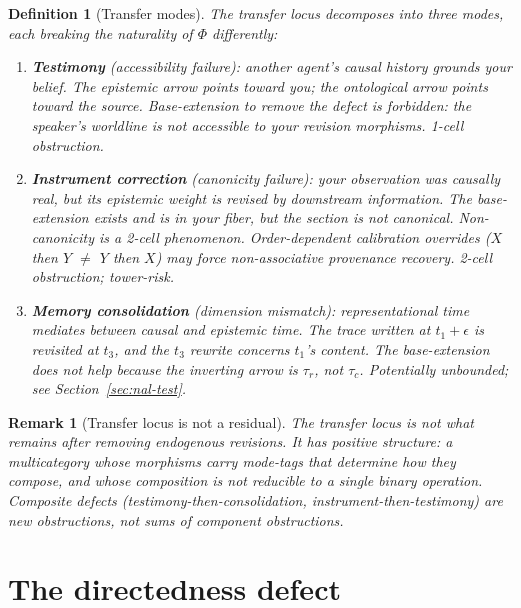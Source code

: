 \documentclass[11pt]{article}
\newtheorem{definition}{Definition}
\newtheorem{remark}{Remark}
\newcommand{\tauc}{\tau_c}
\newcommand{\taur}{\tau_r}
\begin{document}
\begin{definition}[Transfer modes]
\label{def:transfer-modes}
The transfer locus decomposes into three modes, each breaking the naturality of $\Phi$
differently:
\begin{enumerate}
  \item \textbf{Testimony} (accessibility failure): another agent's causal history grounds your
        belief. The epistemic arrow points toward you; the ontological arrow points toward the
        source. Base-extension to remove the defect is \emph{forbidden}: the speaker's worldline
        is not accessible to your revision morphisms. \emph{1-cell obstruction.}

  \item \textbf{Instrument correction} (canonicity failure): your observation was causally real,
        but its epistemic weight is revised by downstream information. The base-extension exists
        and is in your fiber, but the section is not canonical. Non-canonicity is a 2-cell
        phenomenon. Order-dependent calibration overrides ($X$ then $Y$ $\neq$ $Y$ then $X$)
        may force non-associative provenance recovery. \emph{2-cell obstruction; tower-risk.}

  \item \textbf{Memory consolidation} (dimension mismatch): representational time mediates
        between causal and epistemic time. The trace written at $t_1 + \epsilon$ is revisited at
        $t_3$, and the $t_3$ rewrite concerns $t_1$'s content. The base-extension does not help
        because the inverting arrow is $\taur$, not $\tauc$. \emph{Potentially unbounded;
        see Section~\ref{sec:nal-test}.}
\end{enumerate}
\end{definition}

\begin{remark}[Transfer locus is not a residual]
\label{rem:not-residual}
The transfer locus is not what remains after removing endogenous revisions. It has positive
structure: a \emph{multicategory} whose morphisms carry mode-tags that determine how they
compose, and whose composition is not reducible to a single binary operation. Composite defects
(testimony-then-consolidation, instrument-then-testimony) are new obstructions, not sums of
component obstructions.
\end{remark}

\section{The directedness defect}
\end{document}
